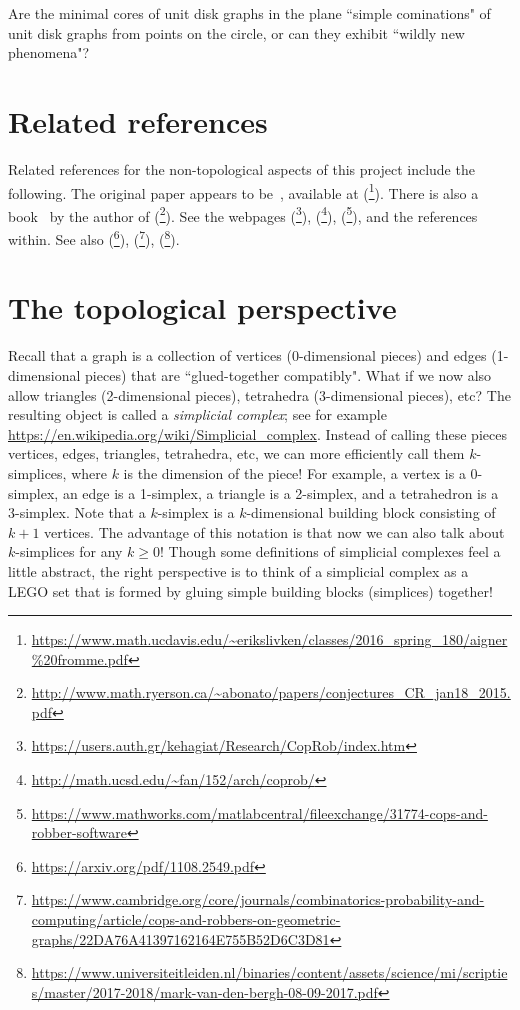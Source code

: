 \documentclass[amscd, amssymb, verbatim]{amsart}[12pt]
\theoremstyle{plain}
\theoremstyle{definition}
\begin{document}
Are the minimal cores of unit disk graphs in the plane ``simple cominations" of unit disk graphs from points on the circle, or can they exhibit ``wildly new phenomena"?



\section{Related references}

Related references for the non-topological aspects of this project include the following.
The original paper appears to be~\cite{aigner1984game}, available at (\footnote{\url{https://www.math.ucdavis.edu/~erikslivken/classes/2016\_spring\_180/aigner\%20fromme.pdf}}). There is also a book~\cite{bonato2011game} by the author of (\footnote{\url{http://www.math.ryerson.ca/~abonato/papers/conjectures\_CR\_jan18\_2015.pdf}}). See the webpages (\footnote{\url{https://users.auth.gr/kehagiat/Research/CopRob/index.htm}}), (\footnote{\url{http://math.ucsd.edu/~fan/152/arch/coprob/}}), (\footnote{\url{https://www.mathworks.com/matlabcentral/fileexchange/31774-cops-and-robber-software}}), and the references within. See also (\footnote{\url{https://arxiv.org/pdf/1108.2549.pdf}}), (\footnote{\url{https://www.cambridge.org/core/journals/combinatorics-probability-and-computing/article/cops-and-robbers-on-geometric-graphs/22DA76A41397162164E755B52D6C3D81}}), (\footnote{\url{https://www.universiteitleiden.nl/binaries/content/assets/science/mi/scripties/master/2017-2018/mark-van-den-bergh-08-09-2017.pdf}}).



\newpage


\section{The topological perspective}

Recall that a graph is a collection of vertices (0-dimensional pieces) and edges (1-dimensional pieces) that are ``glued-together compatibly".
What if we now also allow triangles (2-dimensional pieces), tetrahedra (3-dimensional pieces), etc? The resulting object is called a \emph{simplicial complex}; see for example \url{https://en.wikipedia.org/wiki/Simplicial\_complex}. 
Instead of calling these pieces vertices, edges, triangles, tetrahedra, etc, we can more efficiently call them $k$-simplices, where $k$ is the dimension of the piece!
For example, a vertex is a 0-simplex, an edge is a 1-simplex, a triangle is a 2-simplex, and a tetrahedron is a 3-simplex. Note that a $k$-simplex is a $k$-dimensional building block consisting of $k+1$ vertices. The advantage of this notation is that now we can also talk about $k$-simplices for any $k\ge 0$!
Though some definitions of simplicial complexes feel a little abstract, the right perspective is to think of a simplicial complex as a LEGO set that is formed by gluing simple building blocks (simplices) together!
\end{document}
